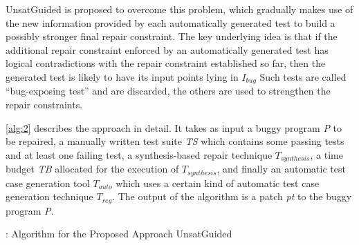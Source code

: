 UnsatGuided is proposed to overcome this problem, which gradually makes use of the new information provided by each automatically generated test to build a possibly stronger final repair constraint. 
The key underlying idea is that if the additional repair constraint enforced by an automatically generated test has logical contradictions with the repair constraint established so far, then the generated test is likely to have its input points lying in $I_{bug}$
Such tests are called ``bug-exposing test'' and are discarded, the others are used to strengthen the repair constraints.

\autoref{alg:2} describes the approach in detail. 
It takes as input a buggy program \emph{P} to be repaired, a manually written test suite \emph{TS} which contains some passing tests and at least one failing test, a synthesis-based repair technique $T_{synthesis}$, a time budget \emph{TB} allocated for the execution of $T_{synthesis}$, and finally an automatic test case generation tool $T_{auto}$ which uses a certain kind of automatic test case generation technique $T_{reg}$. 
The output of the algorithm is a patch \emph{pt} to the buggy program \emph{P}.

\begin{algorithm}[t]
	\begin{algorithmic}[1]
		\Else
			\EndFor
				\Else
				\EndIf
			\EndFor
		\EndIf
	\end{algorithmic}
	\caption{: Algorithm for the Proposed Approach UnsatGuided}
	\label{alg:2}
\end{algorithm}

